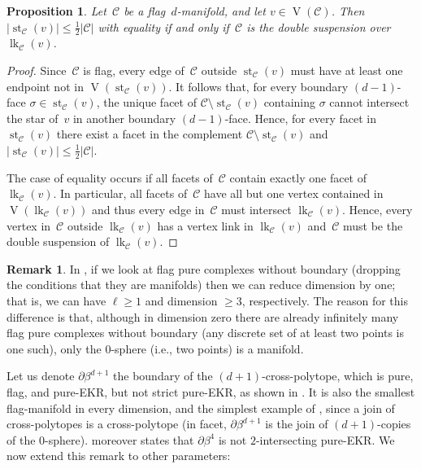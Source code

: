 \documentclass[a4paper,12pt]{amsart}
\theoremstyle{plain}
\newtheorem{proposition}[theorem]{Proposition}
\theoremstyle{definition}
\newtheorem{remark}[theorem]{Remark}
\newcommand{\C}{\mathcal C}
\newcommand{\face}{\sigma}
\DeclareMathOperator{\link}{lk}
\DeclareMathOperator{\st}{st}
\DeclareMathOperator{\vertices}{V}
\begin{document}
\begin{proposition}
\label{prop:flaghalf}
  Let~$\C$ be a flag~$d$-manifold, and let $v \in \vertices(\C)$. Then $ |\st_\C (v)| \leq \frac12 |\C|$ with equality if and only if~$\C$ is the double suspension over $\link_\C (v)$.
\end{proposition}

\begin{proof}
  Since~$\C$ is flag, every edge of~$\C$ outside $\st_\C (v)$ must have at least one endpoint not in  $\vertices(\st_\C (v))$. It follows that, for every boundary $(d-1)$-face $\face \in \st_\C (v)$, the unique facet of $\C \setminus \st_\C (v)$ containing $\face$ cannot intersect the star of~$v$ in another boundary $(d-1)$-face. Hence, for every facet in $\st_\C (v)$ there exist a facet in the complement $\C \setminus \st_\C (v)$ and $ |\st_\C (v)| \leq \frac12 |\C|$.

  The case of equality occurs if all facets of~$\C$ contain exactly one facet of $\link_\C(v)$. In particular, all facets of~$\C$ have all but one vertex contained in $\vertices(\link_\C(v))$ and thus every edge in~$\C$ must intersect $\link_\C(v)$. Hence, every vertex in~$\C$ outside $\link_\C(v)$ has a vertex link in $\link_\C(v)$ and~$\C$ must be the double suspension of $\link_\C(v)$.
\end{proof}

\begin{remark}
In , if we look at flag pure complexes without boundary (dropping the conditions that they are manifolds) then we can reduce dimension by one; that is, we can have $\ell \ge 1$ and dimension $\ge 3$, respectively.
The reason for this difference is that, although in dimension zero there are already infinitely many flag pure complexes without boundary (any discrete set of at least two points is one such), only the $0$-sphere (i.e., two points) is a manifold.
\end{remark}

Let us denote $\partial \beta^{d+1}$ the boundary of the $(d+1)$-cross-polytope, which is pure, flag, and pure-EKR, but not strict pure-EKR, as shown in . It is also the smallest flag-manifold in every dimension, and the simplest example of
, since a join of cross-polytopes is a cross-polytope (in facet, $\partial \beta^{d+1}$ is the join of $(d+1)$-copies of the $0$-sphere).
 moreover states that $\partial \beta^{4}$ is not $2$-intersecting pure-EKR. We now extend this remark  to other parameters:
\end{document}
